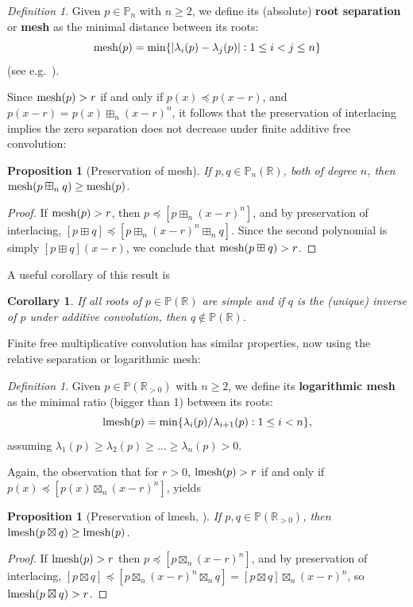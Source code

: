 \documentclass[reqno,11pt]{amsart}
\newtheorem{corollary}[theorem]{Corollary}
\newtheorem{proposition}[theorem]{Proposition}
\theoremstyle{remark}
\newtheorem{definition}[theorem]{Definition}
\newcommand{\mesh}{\mathop{\rm mesh}}
\newcommand{\lmesh}{\mathop{\rm lmesh}}
\renewcommand{\P}{\mathbb{P}}
\newcommand{\R}{\mathbb{R}}
\newcommand{\pp}{\mathbb{P}}
\newcommand{\rr}{\mathbb{R}}
\begin{document}
\begin{definition}
Given $p\in\P_n$ with $n\geq 2$, we define its (absolute) \textbf{root separation} or \textbf{mesh} as the minimal distance between its roots:
$$
\mesh (p)=\min \{|\lambda_i(p)-\lambda_j(p)| : 1\leq i <j \leq n\}
$$
(see e.g.~\cite{Branden16}).
\end{definition}
Since $\mesh(p)>r$ if and only if $p(x)\preccurlyeq p(x-r)$, and $p(x-r)=p(x) \boxplus_n(x-r)^n$, it follows that the preservation of interlacing implies the zero separation does not decrease under finite additive free convolution:
\begin{proposition}[Preservation of mesh]
\label{lem:preserving.mesh}
If $p,q\in \P_n(\R)$, both of degree $n$,  then 
$\mesh(p\boxplus_n q) \geq \mesh(p)$.
\end{proposition}
\begin{proof}
If $\mesh(p)>r$, then $p\preccurlyeq [p \boxplus_n(x-r)^n]$, and by preservation of interlacing, $[p\boxplus q] \preccurlyeq [p \boxplus_n(x-r)^n \boxplus_n q]$. Since the second polynomial is simply $[p\boxplus q](x-r)$, we conclude that $\mesh(p\boxplus q)>r$.
\end{proof}

A useful corollary of this result is
\begin{corollary} \label{cor:meshincreas}
If all roots of $p\in \P(\rr)$ are simple and if $q$ is the (unique) inverse of $p$ under additive convolution, then $q\notin \P(\rr)$. 
\end{corollary}

Finite free multiplicative convolution has similar properties, now using the relative separation or logarithmic mesh:
\begin{definition}
Given $p\in \pp(\rr_{>0})$ with $n\geq 2$, we define its \textbf{logarithmic mesh} as the minimal ratio (bigger than 1) between its roots:
$$
\lmesh(p)=\min \{ \lambda_i(p)/\lambda_{i+1}(p)  : 1\leq i <  n\},
$$
assuming $\lambda_1(p)\geq \lambda_2(p)\geq \dots \geq \lambda_n(p)>0$.
\end{definition}

Again, the observation that for $r>0$,  $\lmesh(p)>r$ if and only if $p(x) \preccurlyeq [p(x) \boxtimes_n(x-r)^n]$, yields
\begin{proposition}[Preservation of lmesh, \cite{MR2755692}]
\label{lem:preserving.lmesh}
If $p,q\in \pp(\rr_{>0})$, then
$\lmesh(p\boxtimes q) \geq \lmesh(p)$.
\end{proposition}
\begin{proof}
If $\lmesh(p)>r$ then $p\preccurlyeq [p \boxtimes_n(x-r)^n]$, and by preservation of interlacing, $[p\boxtimes q]\preccurlyeq [p \boxtimes_n(x-r)^n \boxtimes_n q]=[p\boxtimes q] \boxtimes_n(x-r)^n$, so $\lmesh(p\boxtimes q)>r$.
\end{proof}
 
\end{document}
